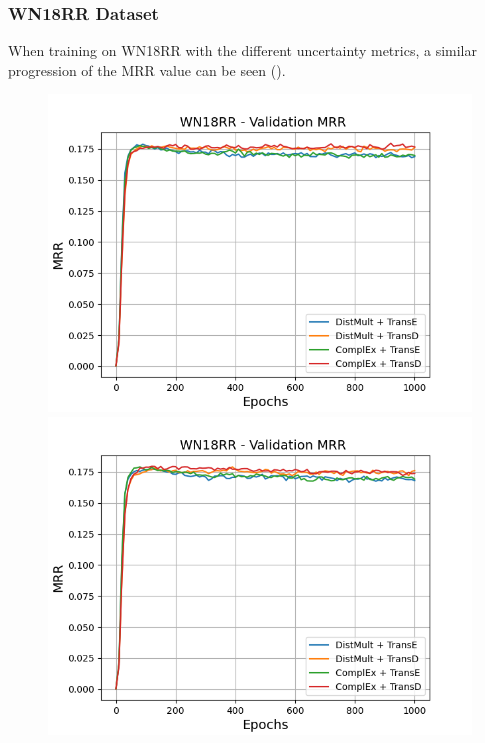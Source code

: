 \subsubsection{WN18RR Dataset}
\label{subsubsec:metrics_wn18rr}
%
When training \usgan on \textsc{WN18RR} with the different uncertainty metrics, a similar progression of the MRR value can be seen ().
\begin{figure}
    \centering
    \begin{minipage}{.5\textwidth}
      \centering
      \includegraphics[width=0.9\linewidth]{figures/results/gan_train/not_pretrained/uncertainty/max_distribution/entropy/wn18rr/1k_epochs/uncertainty_wn18rr_mrrs.png}
    \end{minipage}%
    \begin{minipage}{.5\textwidth}
      \centering
      \includegraphics[width=0.9\linewidth]{figures/results/gan_train/not_pretrained/uncertainty/max_distribution/least_confidence/wn18rr/uncertainty_wn18rr_mrrs.png}

\end{minipage}
\end{figure}
